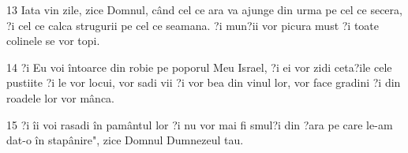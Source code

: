 \par 13 Iata vin zile, zice Domnul, când cel ce ara va ajunge din urma pe cel ce secera, ?i cel ce calca strugurii pe cel ce seamana. ?i mun?ii vor picura must ?i toate colinele se vor topi.
\par 14 ?i Eu voi întoarce din robie pe poporul Meu Israel, ?i ei vor zidi ceta?ile cele pustiite ?i le vor locui, vor sadi vii ?i vor bea din vinul lor, vor face gradini ?i din roadele lor vor mânca.
\par 15 ?i îi voi rasadi în pamântul lor ?i nu vor mai fi smul?i din ?ara pe care le-am dat-o în stapânire", zice Domnul Dumnezeul tau.


